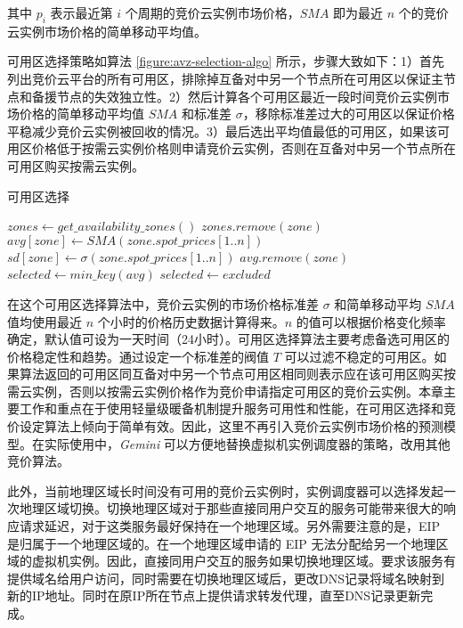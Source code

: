 其中 $p_i$ 表示最近第 $i$ 个周期的竞价云实例市场价格，$SMA$ 即为最近 $n$ 个的竞价云实例市场价格的简单移动平均值。

可用区选择策略如算法 \ref{figure:avz-selection-algo} 所示，步骤大致如下：1）首先列出竞价云平台的所有可用区，排除掉互备对中另一个节点所在可用区以保证主节点和备援节点的失效独立性。2）然后计算各个可用区最近一段时间竞价云实例市场价格的简单移动平均值 $SMA$ 和标准差 $\sigma$，移除标准差过大的可用区以保证价格平稳减少竞价云实例被回收的情况。3）最后选出平均值最低的可用区，如果该可用区价格低于按需云实例价格则申请竞价云实例，否则在互备对中另一个节点所在可用区购买按需云实例。
\begin{algorithm}
\caption{可用区选择}
\label{figure:avz-selection-algo}
$zones\gets get\_availability\_zones()$
{
  {
    $zones.remove(zone)$\;
  }
}
{
  $avg[zone]\gets SMA(zone.spot\_prices[1..n])$
  $sd[zone]\gets \sigma(zone.spot\_prices[1..n])$
}
{
  {
    $avg.remove(zone)$\;
  }
}
$selected\gets min\_key(avg)$\;
{
  $selected\gets excluded$\;
}
\;
\end{algorithm}

在这个可用区选择算法中，竞价云实例的市场价格标准差 $\sigma$ 和简单移动平均 $SMA$ 值均使用最近 $n$ 个小时的价格历史数据计算得来。$n$ 的值可以根据价格变化频率确定，默认值可设为一天时间（24小时）。可用区选择算法主要考虑备选可用区的价格稳定性和趋势。通过设定一个标准差的阀值 $T$ 可以过滤不稳定的可用区。如果算法返回的可用区同互备对中另一个节点可用区相同则表示应在该可用区购买按需云实例，否则以按需云实例价格作为竞价申请指定可用区的竞价云实例。本章主要工作和重点在于使用轻量级暖备机制提升服务可用性和性能，在可用区选择和竞价设定算法上倾向于简单有效。因此，这里不再引入竞价云实例市场价格的预测模型。在实际使用中，\emph{Gemini} 可以方便地替换虚拟机实例调度器的策略，改用其他竞价算法。

此外，当前地理区域长时间没有可用的竞价云实例时，实例调度器可以选择发起一次地理区域切换。切换地理区域对于那些直接同用户交互的服务可能带来很大的响应请求延迟，对于这类服务最好保持在一个地理区域。另外需要注意的是，EIP 是归属于一个地理区域的。在一个地理区域申请的 EIP 无法分配给另一个地理区域的虚拟机实例。因此，直接同用户交互的服务如果切换地理区域。要求该服务有提供域名给用户访问，同时需要在切换地理区域后，更改DNS记录将域名映射到新的IP地址。同时在原IP所在节点上提供请求转发代理，直至DNS记录更新完成。


